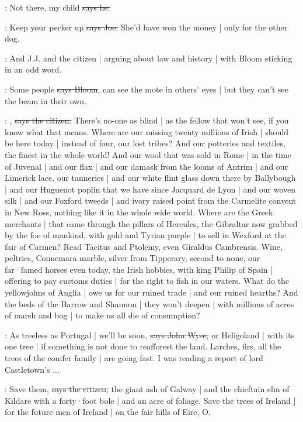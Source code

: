 \lenehan:
Not there,
my child
\sout{says he.}

\joe:
Keep your pecker up
\sout{says Joe.}
She'd have won the money |
only for the other dog.

\Nq:
And J.J. and the citizen |
arguing about law and history |
with Bloom sticking in an odd word.

\Bloom:
Some people
\sout{says Bloom},
can see the mote in others' eyes |
but they can't see the beam in their own.

\citizen:
,
\sout{says the citizen.}
There's no-one as blind |
as the fellow that won't see,
if you know what that means.
Where are our missing twenty millions of Irish |
should be here today |
instead of four,
our lost tribes?
And our potteries and textiles,
the finest in the whole world!
And our wool that was sold in Rome |
in the time of Juvenal |
and our flax |
and our damask from the looms of Antrim |
and our Limerick lace,
our tanneries |
and our white flint glass down there by Ballybough |
and our Huguenot poplin that we have since Jacquard de Lyon |
and our woven silk |
and our Foxford tweeds |
and ivory raised point from the Carmelite convent in New Ross,
nothing like it in the whole wide world.
Where are the Greek merchants |
that came through the pillars of Hercules,
the Gibraltar now grabbed by the foe of mankind,
with gold and Tyrian purple |
to sell in Wexford at the fair of Carmen?
Read Tacitus and Ptolemy,
even Giraldus Cambrensis.
Wine,
peltries,
Connemara marble,
silver from Tipperary,
second to none,
our far·famed horses even today,
the Irish hobbies,
with king Philip of Spain |
offering to pay customs duties |
for the right to fish in our waters.
What do the yellowjohns of Anglia |
owe us for our ruined trade |
and our ruined hearths?
And the beds of the Barrow and Shannon |
they won't deepen |
with millions of acres of marsh and bog |
to make us all die of consumption?

\johnwyse:
As treeless as Portugal |
we'll be soon,
\sout{says John Wyse,}
or Heligoland |
with its one tree |
if something is not done to reafforest the land.
Larches,
firs,
all the trees of the conifer family |
are going fast.
I was reading a report of lord Castletown's ...

\citizen:
Save them,
\sout{says the citizen,}
the giant ash of Galway |
and the chieftain elm of Kildare with a forty·foot bole |
and an acre of foliage.
Save the trees of Ireland |
for the future men of Ireland |
on the fair hills of Eire,
O.

